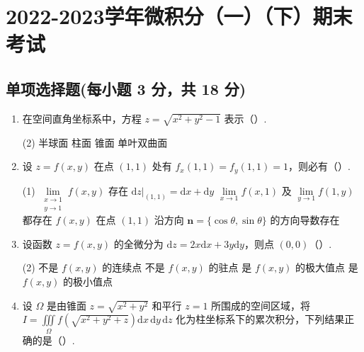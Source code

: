 \documentclass[../Main.tex]{subfiles}
\begin{document}
\chapter{2022-2023学年微积分（一）（下）期末考试}

\section{单项选择题(每小题 3 分，共 18 分)}
\begin{enumerate}
  \item 在空间直角坐标系中，方程 \( z = \sqrt{x^2 + y^2 - 1} \) 表示（\qquad）.

        \begin{tasks}[label=\textbf{\Alph*.}, label-width=1.5em, column-sep=1em](2)
          \task 半球面
          \task 柱面
          \task 锥面
          \task 单叶双曲面
        \end{tasks}

  \item 设 \( z = f(x, y) \) 在点 \( (1,1) \) 处有 \( f_x(1,1) = f_y(1,1) = 1 \)，则必有（\qquad）.

        \begin{tasks}[label=\textbf{\Alph*.}, label-width=1.5em, column-sep=1em](1)
          \task \( \lim\limits_{\substack{x \to 1 \\ y \to 1}} f(x, y) \) 存在
          \task \( \mathrm{d}z|_{(1,1)} = \mathrm{d}x + \mathrm{d}y \)
          \task \( \lim\limits_{x \to 1} f(x, 1) \) 及 \( \lim\limits_{y \to 1} f(1, y) \) 都存在
          \task \( f(x, y) \) 在点 \( (1,1) \) 沿方向 \( \boldsymbol{n} = \{\cos\theta, \sin\theta\} \) 的方向导数存在
        \end{tasks}

  \item 设函数 \( z = f(x, y) \) 的全微分为 \( \mathrm{d}z = 2x \mathrm{d}x + 3y \mathrm{d}y \)，则点 \( (0,0) \)（\qquad）.

        \begin{tasks}[label=\textbf{\Alph*.}, label-width=1.5em, column-sep=1em](2)
          \task 不是 \( f(x, y) \) 的连续点
          \task 不是 \( f(x, y) \) 的驻点
          \task 是 \( f(x, y) \) 的极大值点
          \task 是 \( f(x, y) \) 的极小值点
        \end{tasks}

  \item 设 \( \Omega \) 是由锥面 \( z = \sqrt{x^2 + y^2} \) 和平行 \( z = 1 \) 所围成的空间区域，将 \( I = \displaystyle \iiint \limits_{\Omega} f(\sqrt{x^2 + y^2 + z}) \mathrm{d}x\,\mathrm{d}y\,\mathrm{d}z \) 化为柱坐标系下的累次积分，下列结果正确的是（\qquad）.


\end{enumerate}
\end{document}
